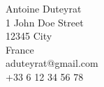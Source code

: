 
Antoine Duteyrat\\
1 John Doe Street\\
12345 City\\
France\\
aduteyrat@gmail.com\\
+33 6 12 34 56 78